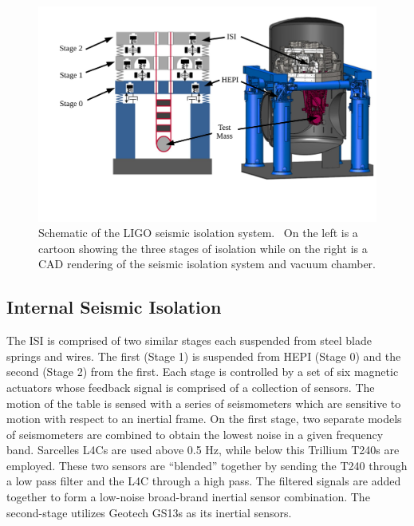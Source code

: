 \documentclass [12pt, proquest]{uwthesis}[2019]
\begin{document}
\begin{figure}[!h]
\begin{center}
\includegraphics[width=\textwidth]{seismicIso.pdf}
\caption[Schematic of the LIGO seismic isolation system]{Schematic of the LIGO seismic isolation system.~\cite{ligoSeis} On the left is a cartoon showing the three stages of isolation while on the right is a CAD rendering of the seismic isolation system and vacuum chamber.}
\label{wind}
\end{center}
\end{figure}

\subsection{Internal Seismic Isolation}\label{ISI}

The ISI is comprised of two similar stages each suspended from steel blade springs and wires. The first (Stage 1) is suspended from HEPI (Stage 0) and the second (Stage 2) from the first. Each stage is controlled by a set of six magnetic actuators whose feedback signal is comprised of a collection of sensors. The motion of the table is sensed with a series of seismometers which are sensitive to motion with respect to an inertial frame. On the first stage, two separate models of seismometers are combined to obtain the lowest noise in a given frequency band. Sarcelles L4Cs are used above 0.5 Hz, while below this Trillium T240s are employed. These two sensors are ``blended'' together by sending the T240 through a low pass filter and the L4C through a high pass. The filtered signals are added together to form a low-noise broad-brand inertial sensor combination. The second-stage utilizes Geotech GS13s as its inertial sensors.
\end{document}
